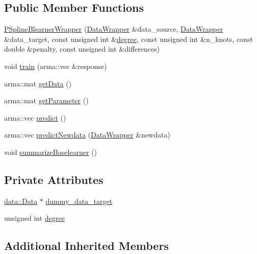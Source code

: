 \subsection*{Public Member Functions}
\begin{DoxyCompactItemize}
\item 
\mbox{\hyperlink{class_p_spline_blearner_wrapper_a1272a29283aa7815d2f4d06ba70cecf6}{P\+Spline\+Blearner\+Wrapper}} (\mbox{\hyperlink{class_data_wrapper}{Data\+Wrapper}} \&data\+\_\+source, \mbox{\hyperlink{class_data_wrapper}{Data\+Wrapper}} \&data\+\_\+target, const unsigned int \&\mbox{\hyperlink{class_p_spline_blearner_wrapper_a3828bb3245f840146ed83b0f9b3777f3}{degree}}, const unsigned int \&n\+\_\+knots, const double \&penalty, const unsigned int \&differences)
\item 
void \mbox{\hyperlink{class_p_spline_blearner_wrapper_a10193fd93f82c2c333e704d7cb67dd27}{train}} (arma\+::vec \&response)
\item 
arma\+::mat \mbox{\hyperlink{class_p_spline_blearner_wrapper_ad18db8163e5356b45e5196a51d2561a8}{get\+Data}} ()
\item 
arma\+::mat \mbox{\hyperlink{class_p_spline_blearner_wrapper_a2d9c9e319c4638c85a4d419918929f9b}{get\+Parameter}} ()
\item 
arma\+::vec \mbox{\hyperlink{class_p_spline_blearner_wrapper_a43a442f80348b28fc40d8e4773678511}{predict}} ()
\item 
arma\+::vec \mbox{\hyperlink{class_p_spline_blearner_wrapper_af90fe0fce13519086f8e54fe4d2cc539}{predict\+Newdata}} (\mbox{\hyperlink{class_data_wrapper}{Data\+Wrapper}} \&newdata)
\item 
void \mbox{\hyperlink{class_p_spline_blearner_wrapper_a7796ee928de438649ede7aa1aa57263a}{summarize\+Baselearner}} ()
\end{DoxyCompactItemize}
\subsection*{Private Attributes}
\begin{DoxyCompactItemize}
\item 
\mbox{\hyperlink{classdata_1_1_data}{data\+::\+Data}} $\ast$ \mbox{\hyperlink{class_p_spline_blearner_wrapper_ac9e6f943e55476a93df376020818f44c}{dummy\+\_\+data\+\_\+target}}
\item 
unsigned int \mbox{\hyperlink{class_p_spline_blearner_wrapper_a3828bb3245f840146ed83b0f9b3777f3}{degree}}
\end{DoxyCompactItemize}
\subsection*{Additional Inherited Members}


